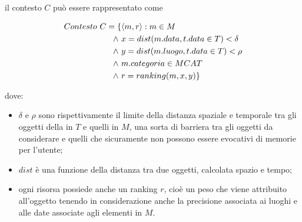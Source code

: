 \documentclass[sigproc-sp.tex]{subfiles}
\begin{document}
il contesto $C$  può essere rappresentato come

\begin{equation}
\begin{split}
Contesto \ C =  \{&\langle m,r\rangle : m \in M\\
\wedge \ &x = dist ( m.data,t.data \in T ) < \delta\\
\wedge \ &y = dist ( m.luogo,t.data \in T ) < \rho\\
\wedge \ &m.categoria \in MCAT\\
\wedge \ &r = ranking ( m,x,y ) \}
\end{split}
\notag
\end{equation}

dove:
\begin{itemize}
\item $\delta$ e $\rho$ sono rispettivamente il limite della distanza spaziale e temporale tra gli oggetti della in $T$ e quelli in $M$, una sorta di barriera tra gli oggetti da considerare e quelli che sicuramente non possono essere evocativi di memorie per l'utente;
\item $dist$ è una funzione della distanza tra due oggetti, calcolata spazio e tempo;
\item ogni risorsa possiede anche un ranking $r$, cioè un peso che viene attribuito all'oggetto tenendo in considerazione anche la precisione associata ai luoghi e alle date associate agli elementi in $M$.
\end{itemize}
\end{document}
